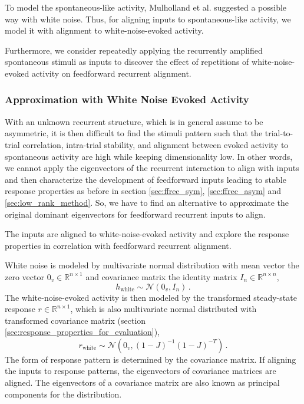 \documentclass[11pt]{article}
\begin{document}
	To model the spontaneous-like activity, Mulholland et al. \cite{cosyne2023} suggested a possible way with white noise. Thus, for aligning inputs to spontaneous-like activity, we model it with alignment to white-noise-evoked activity.  
	
	Furthermore, we consider repeatedly applying the recurrently amplified spontaneous stimuli as inputs to discover the effect of repetitions of white-noise-evoked activity on feedforward recurrent alignment. 
	
	\subsubsection{Approximation with White Noise Evoked Activity} \label{sec:white_noise_approx_ffrec}%
	With an unknown recurrent structure, which is in general assume to be asymmetric, it is then difficult to find the stimuli pattern such that the trial-to-trial correlation, intra-trial stability, and alignment between evoked activity to spontaneous activity are high while keeping dimensionality low. In other words, we cannot apply the eigenvectors of the recurrent interaction to align with inputs and then characterize the development of feedforward inputs leading to stable response properties as before in section \ref{sec:ffrec_sym}, \ref{sec:ffrec_asym} and \ref{sec:low_rank_method}. So, we have to find an alternative to approximate the original dominant eigenvectors for feedforward recurrent inputs to align. 
	
	The inputs are aligned to white-noise-evoked activity and explore the response properties in correlation with feedforward recurrent alignment. 
		
	White noise is modeled by multivariate normal distribution with mean vector the zero vector $0_v \in \mathbb{R}^{n \times 1}$ and covariance matrix the identity matrix $I_n \in \mathbb{R}^{n \times n}$, 
		\begin{equation}
			h_{\text{white}} \sim \mathcal{N}(0_v, I_n) \, .
		\end{equation}
	The white-noise-evoked activity is then modeled by the transformed steady-state response $r \in \mathbb{R}^{n \times 1}$, which is also multivariate normal distributed with transformed covariance matrix (section \ref{sec:response_properties_for_evaluation}), 
		\begin{equation} \label{eq:white_noise_evoked_act}
			r_{\text{white}} \sim \mathcal{N}\left(0_v, (1-J)^{-1}(1-J)^{-T}\right) \, .
		\end{equation}
	The form of response pattern is determined by the covariance matrix. If aligning the inputs to response patterns, the eigenvectors of covariance matrices are aligned. The eigenvectors of a covariance matrix are also known as principal components for the distribution. 
	
\end{document}
